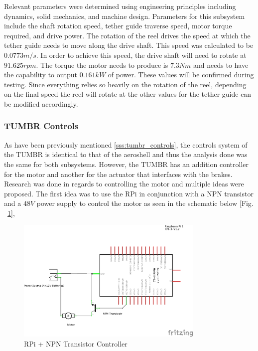 \indent\indent Relevant parameters were determined using engineering principles including dynamics, solid mechanics, and machine design. Parameters for this subsystem include the shaft rotation speed, tether guide traverse speed, motor torque required, and drive power. The rotation of the reel drives the speed at which the tether guide needs to move along the drive shaft. This speed was calculated to be $0.0773 m/s$. In order to achieve this speed, the drive shaft will need to rotate at $91.625 rpm$. The torque the motor needs to produce is $7.3 Nm$ and needs to have the capability to output $0.161 kW$ of power. These values will be confirmed during testing. Since everything relies so heavily on the rotation of the reel, depending on the final speed the reel will rotate at the other values for the tether guide can be modified accordingly. 



\subsubsection{TUMBR Controls}

\indent\indent As have been previously mentioned \ref{sss:tumbr_controls}, the controls system of the TUMBR is identical to that of the aeroshell and thus the analysis done was the same for both subsystems. However, the TUMBR has an addition controller for the motor and another for the actuator that interfaces with the brakes.
Research was done in regards to controlling the motor and multiple ideas were proposed. The first idea was to use the RPi in conjunction with a NPN transistor and a $48V$ power supply to control the motor as seen in the schematic below [Fig. ~\ref{fig:rpi_npn_motor}],

\begin{figure}[H]
  \centering
  \includegraphics[width=0.8\textwidth]{Controls/rpi_npn_motor_schem.png}
  \caption{\label{fig:rpi_npn_motor} RPi + NPN Transistor Controller}
\end{figure}

